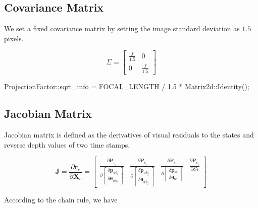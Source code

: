 \documentclass[12pt]{report}   %
\begin{document}
\subsection{Covariance Matrix}

We set a fixed covariance matrix by setting the image standard deviation as $1.5$ pixels.

\begin{equation}
\Sigma = 
\begin{bmatrix}
\frac{f}{1.5} & 0 \\
0 & \frac{f}{1.5}
\end{bmatrix}
\end{equation}

\begin{cppcode}
ProjectionFactor::sqrt_info = FOCAL_LENGTH / 1.5 * Matrix2d::Identity();
\end{cppcode}


\subsection{Jacobian Matrix}

Jacobian matrix is defined as the derivatives of visual residuals to the states and reverse depth values of two time stamps.

\begin{equation}
\mathbf{J} = 
\frac{\partial \mathbf{r}_{c}}{\partial \mathbf{X}_{c}} =
\begin{bmatrix}
\frac{\partial \mathbf{P}_{c_{j}}}
{\partial\left[\begin{array}{c}{\delta \mathbf{p}_{w b_{i}}} \\ 
	{\delta \boldsymbol{\theta}_{w b_{i}}}\end{array}\right]} 
&
\frac{\partial \mathbf{P}_{c_{j}}}
{\partial\left[\begin{array}{c}{\delta \mathbf{p}_{w b_{j}}} \\ 
	{\delta \boldsymbol{\theta}_{w b_{j}}}\end{array}\right]} 
&
\frac{\partial \mathbf{P}_{c_{j}}}
{\partial\left[\begin{array}{c}{\delta \mathbf{p}_{bc}} \\ 
	{\delta \boldsymbol{\theta}_{bc}}\end{array}\right]} 
&
\frac{\partial \mathbf{P}_{c_{j}}}{\partial \delta \lambda}
\end{bmatrix} \label{jacobian}
\end{equation}

According to the chain rule, we have
\end{document}
